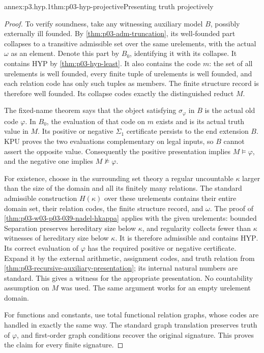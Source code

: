 \begin{annexitem}{annex:p3.hyp.1}{thm:p03-hyp-projective}{Presenting truth projectively}
\begin{proof}
To verify soundness, take any witnessing auxiliary model \(B\),
possibly externally ill founded. By
\cref{thm:p03-adm-truncation}, its well-founded part collapses to a
transitive admissible set over the same urelements, with the actual
\(\omega\) as an element. Denote this part by \(B_0\), identifying
it with its collapse. It contains \(\mathrm{HYP}\) by
\cref{thm:p03-hyp-least}. It also contains the code \(m\): the set
of all urelements is well founded, every finite tuple of urelements
is well founded, and each relation code has only such tuples as
members. The finite structure record is therefore well founded.
Its collapse codes exactly the distinguished reduct \(M\).

The fixed-name theorem says that the object satisfying
\(\sigma_\varphi\) in \(B\) is the actual old code \(\varphi\).
In \(B_0\), the evaluation of that code on \(m\) exists and is
its actual truth value in \(M\). Its positive or negative
\(\Sigma_1\) certificate persists to the end extension \(B\).
KPU proves the two evaluations complementary on legal inputs, so
\(B\) cannot assert the opposite value. Consequently the positive
presentation implies \(M\models\varphi\), and the negative one
implies \(M\not\models\varphi\).

For existence, choose in the surrounding set theory a regular
uncountable \(\kappa\) larger than the size of the domain and all
its finitely many relations. The standard admissible construction
\(H(\kappa)\) over these urelements contains their entire domain
set, their relation codes, the finite structure record, and
\(\omega\). The proof of
\cref{thm:p03-w03-p03-039-nadel-hkappa} applies with the given
urelements: bounded Separation preserves hereditary size below
\(\kappa\), and regularity collects fewer than \(\kappa\)
witnesses of hereditary size below \(\kappa\). It is therefore
admissible and contains \(\mathrm{HYP}\). Its correct evaluation
of \(\varphi\) has the required positive or negative certificate.
Expand it by the external arithmetic, assignment codes, and truth
relation from \cref{thm:p03-recursive-auxiliary-presentation}; its
internal natural numbers are standard. This gives a witness for the
appropriate presentation. No countability assumption on \(M\) was
used. The same argument works for an empty urelement domain.

For functions and constants, use total functional relation graphs,
whose codes are handled in exactly the same way. The standard graph
translation preserves truth of \(\varphi\), and first-order graph
conditions recover the original signature. This proves the claim for
every finite signature.
\end{proof}
\end{annexitem}

